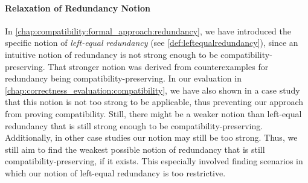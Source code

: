 
\paragraph{Relaxation of Redundancy Notion}
\label{chap:futurework:correctness:compatibility:redundancy}
In \autoref{chap:compatibility:formal_approach:redundancy}, we have introduced the specific notion of \emph{left-equal redundancy} (see \autoref{def:leftequalredundancy}), since an intuitive notion of redundancy is not strong enough to be compatibility-preserving.
That stronger notion was derived from counterexamples for redundancy being compatibility-preserving.
In our evaluation in \autoref{chap:correctness_evaluation:compatibility}, we have also shown in a case study that this notion is not too strong to be applicable, thus preventing our approach from proving compatibility.
Still, there might be a weaker notion than left-equal redundancy that is still strong enough to be compatibility-preserving.
Additionally, in other case studies our notion may still be too strong.
Thus, we still aim to find the weakest possible notion of redundancy that is still compatibility-preserving, if it exists. 
This especially involved finding scenarios in which our notion of left-equal redundancy is too restrictive.

